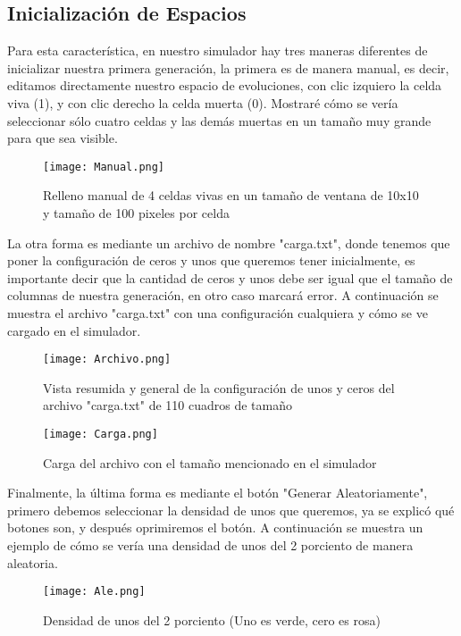\documentclass{article}
\begin{document}
	\subsection{Inicialización de Espacios}
	Para esta característica, en nuestro simulador hay tres maneras diferentes de inicializar nuestra primera generación, la primera es de manera manual, es decir, editamos directamente nuestro espacio de evoluciones, con clic izquiero la celda viva (1), y con clic derecho la celda muerta (0). Mostraré cómo se vería seleccionar sólo cuatro celdas y las demás muertas en un tamaño muy grande para que sea visible. 
	
	\begin{figure}[h]
		\centering       
		\texttt{[image: Manual.png]}
		\caption{Relleno manual de 4 celdas vivas en un tamaño de ventana de 10x10 y tamaño de 100 pixeles por celda}
		\label{fig:mi_imagen1}
	\end{figure}
	
	La otra forma es mediante un archivo de nombre "carga.txt", donde tenemos que poner la configuración de ceros y unos que queremos tener inicialmente, es importante decir que la cantidad de ceros y unos debe ser igual que el tamaño de columnas de nuestra generación, en otro caso marcará error. A continuación se muestra el archivo "carga.txt" con una configuración cualquiera y cómo se ve cargado en el simulador. 
	
	\begin{figure}[h]
		\centering       
		\texttt{[image: Archivo.png]}
		\caption{Vista resumida y general de la configuración de unos y ceros del archivo "carga.txt" de 110 cuadros de tamaño}
		\label{fig:mi_imagen1}
	\end{figure}
	
	\begin{figure}[h]
		\centering       
		\texttt{[image: Carga.png]}
		\caption{Carga del archivo con el tamaño mencionado en el simulador}
		\label{fig:mi_imagen1}
	\end{figure}
	
	\vspace{300pt}	
	Finalmente, la última forma es mediante el botón "Generar Aleatoriamente", primero debemos seleccionar la densidad de unos que queremos, ya se explicó qué botones son, y después oprimiremos el botón. A continuación se muestra un ejemplo de cómo se vería una densidad de unos del 2 porciento de manera aleatoria. 
	
	\begin{figure}[h]
		\centering       
		\texttt{[image: Ale.png]}
		\caption{Densidad de unos del 2 porciento (Uno es verde, cero es rosa)}
		\label{fig:mi_imagen1}
	\end{figure}
	
\end{document}
